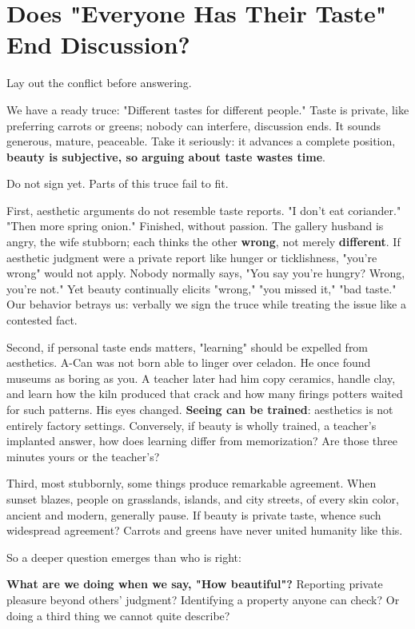 \section[Does Personal Taste End Discussion?]{Does "Everyone Has Their Taste" End Discussion?}
Lay out the conflict before answering.

We have a ready truce: "Different tastes for different people." Taste is private, like preferring carrots or greens; nobody can interfere, discussion ends. It sounds generous, mature, peaceable. Take it seriously: it advances a complete position, \textbf{beauty is subjective, so arguing about taste wastes time}.

Do not sign yet. Parts of this truce fail to fit.

First, aesthetic arguments do not resemble taste reports. "I don't eat coriander." "Then more spring onion." Finished, without passion. The gallery husband is angry, the wife stubborn; each thinks the other \textbf{wrong}, not merely \textbf{different}. If aesthetic judgment were a private report like hunger or ticklishness, "you're wrong" would not apply. Nobody normally says, "You say you're hungry? Wrong, you're not." Yet beauty continually elicits "wrong," "you missed it," "bad taste." Our behavior betrays us: verbally we sign the truce while treating the issue like a contested fact.

Second, if personal taste ends matters, "learning" should be expelled from aesthetics. A-Can was not born able to linger over celadon. He once found museums as boring as you. A teacher later had him copy ceramics, handle clay, and learn how the kiln produced that crack and how many firings potters waited for such patterns. His eyes changed. \textbf{Seeing can be trained}: aesthetics is not entirely factory settings. Conversely, if beauty is wholly trained, a teacher's implanted answer, how does learning differ from memorization? Are those three minutes yours or the teacher's?

Third, most stubbornly, some things produce remarkable agreement. When sunset blazes, people on grasslands, islands, and city streets, of every skin color, ancient and modern, generally pause. If beauty is private taste, whence such widespread agreement? Carrots and greens have never united humanity like this.

So a deeper question emerges than who is right:

\textbf{What are we doing when we say, "How beautiful"?} Reporting private pleasure beyond others' judgment? Identifying a property anyone can check? Or doing a third thing we cannot quite describe?

